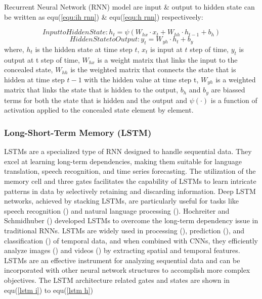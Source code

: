 \documentclass[a4paper,fleqn]{cas-dc}
\begin{document}
Recurrent Neural Network (RNN) model are input \& output to hidden state can be written as equ(\ref{equ:ih rnn}) \& equ(\ref{equ:h rnn}) respectiveely:

  \begin{equation} \label{equ:ih rnn}
    Input to Hidden State: h_t= \psi (W_{hx} \cdot x_t + W_{hh} \cdot h_{t-1} +b_h)
  \end{equation}
  \begin{equation} \label{equ:h rnn}
    Hidden State to Output: y_t=W_{yh}\cdot h_t+b_y
  \end{equation}
where, $h_t $ is the hidden state at time step $t$, $x_t$ is input at $t$ step of time, $y_t$ is output at t step of time, $W_{hx} $ is a weight matrix that links the input to the concealed state, $W_{hh}$ is the weighted matrix that connects the state that is hidden at time step $t-1$ with the hidden value at time step t, $W_{yh}$ is a weighted matrix that links the state that is hidden to the output, $b_h$ and $b_y$ are biassed terms for both the state that is hidden and the output and $\psi (\cdot)$ is a function of activation applied to the concealed state element by element.


\subsubsection{Long-Short-Term Memory (LSTM)}
LSTMs are a specialized type of RNN designed to handle sequential data. They excel at learning long-term dependencies, making them suitable for language translation, speech recognition, and time series forecasting. The utilization of the memory cell and three gates facilitates the capability of LSTMs to learn intricate patterns in data by selectively retaining and discarding information. Deep LSTM networks, achieved by stacking LSTMs, are particularly useful for tasks like speech recognition (\cite{soltau2016neural,jo2020approximate}) and natural language processing (\cite{wang2015learning,nammous2019natural}). Hochreiter and Schmidhuber  (\cite{hochreiter1997long}) developed LSTMs to overcome the long-term dependency issue in traditional RNNs. LSTMs are widely used in processing (\cite{sahin2018nonuniformly}), prediction (\cite{gers2000learning}), and classification (\cite{zhou2015c,karim2017lstm}) of temporal data, and when combined with CNNs, they efficiently analyze images (\cite{li2019cnn,rajendran2020land,islam2020combined}) and videos (\cite{ullah2017action,li2020classifying,gao2017video,bin2018describing}) by extracting spatial and temporal features. LSTMs are an effective instrument for analyzing sequential data and can be incorporated with other neural network structures to accomplish more complex objectives.
The LSTM architecture related gates and states are shown in equ(\ref{lstm i}) to equ(\ref{lstm h})
\end{document}
